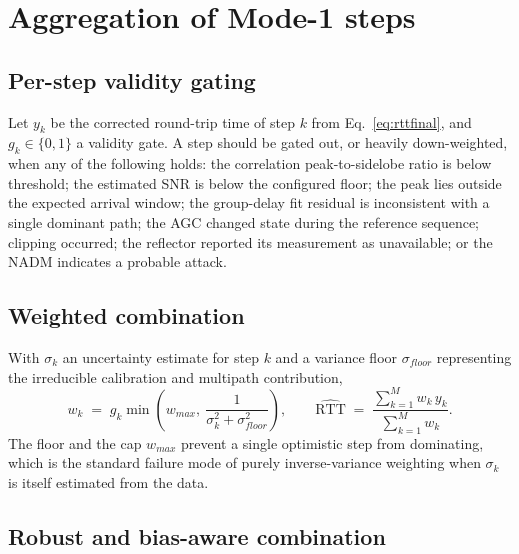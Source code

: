 \documentclass[11pt,a4paper]{article}
\newcommand{\RTT}{\mathrm{RTT}}
\newcommand{\NADM}{\mathrm{NADM}}
\begin{document}

\section{Aggregation of Mode-1 steps}
\label{sec:agg}

\subsection{Per-step validity gating}

Let $y_k$ be the corrected round-trip time of step $k$ from Eq.~\eqref{eq:rttfinal}, and $g_k \in
\{0,1\}$ a validity gate. A step should be gated out, or heavily down-weighted, when any of the
following holds: the correlation peak-to-sidelobe ratio is below threshold; the estimated SNR is
below the configured floor; the peak lies outside the expected arrival window; the group-delay fit
residual is inconsistent with a single dominant path; the AGC changed state during the reference
sequence; clipping occurred; the reflector reported its measurement as unavailable; or the
$\NADM$ indicates a probable attack.

\subsection{Weighted combination}

With $\sigma_k$ an uncertainty estimate for step $k$ and a variance floor $\sigma_{floor}$
representing the irreducible calibration and multipath contribution,
\begin{equation}
w_k \;=\; g_k \min\!\left( w_{max},\ \frac{1}{\sigma_k^2 + \sigma_{floor}^2} \right),
\qquad
\widehat{\RTT} \;=\; \frac{\sum_{k=1}^{M} w_k\, y_k}{\sum_{k=1}^{M} w_k}.
\label{eq:agg}
\end{equation}
The floor and the cap $w_{max}$ prevent a single optimistic step from dominating, which is the
standard failure mode of purely inverse-variance weighting when $\sigma_k$ is itself estimated from
the data.

\subsection{Robust and bias-aware combination}
\end{document}
